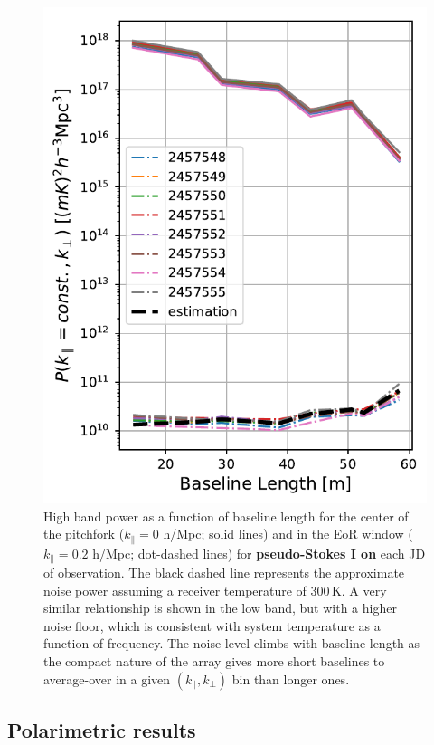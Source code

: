 \documentclass[twocolumn, trackchanges]{aastex61}
\newcommand{\edited}[1]{{\bf \color{red} #1}}
\begin{document}
{\begin{figure}
\centering
\includegraphics[scale=0.5]{noise_estimation.pdf}
\caption{High band power as a function of baseline length for the center of the pitchfork ($k_{\parallel}=0$ h/Mpc; solid lines) and in the EoR window ($k_{\parallel}=0.2$ h/Mpc; dot-dashed lines) for \edited{pseudo-Stokes I on} each JD of observation. The black dashed line represents the approximate noise power assuming a receiver temperature of 300\,K. A very similar relationship is shown in the low band, but with a higher noise floor, which is consistent with system temperature as a function of frequency. The noise level climbs with baseline length as the compact nature of the array gives more short baselines to average-over in a given $(k_{\parallel},k_{\perp})$ bin than longer ones.}
\label{fig:highband_cuts_per_day}
\end{figure}

\subsection{Polarimetric results}
\label{subsec:polarimetric_results}

}
\end{document}
